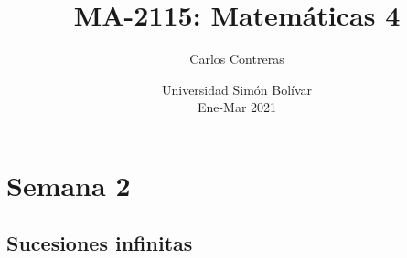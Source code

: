 \documentclass[12pt,oneside]{book}
\title{\bf MA-2115: Matemáticas 4}
\author{Carlos Contreras}
\date{Universidad Simón Bolívar \\ Ene-Mar 2021}
\newcounter{weekpage}
\begin{document}









\chapter{Semana 2}
\setcounter{weekpage}{1}
\thispagestyle{plainweek}


\section{Sucesiones infinitas}
\end{document}

